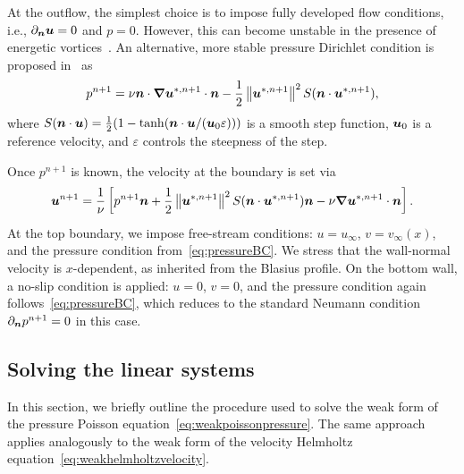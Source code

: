 \documentclass[../main.tex]{subfiles}
\begin{document}
At the outflow, the simplest choice is to impose fully developed flow conditions, i.e., $\partial_{\bm{n}} \bm{u} = 0$ and $p = 0$. However, this can become unstable in the presence of energetic vortices~\cite{nektaruserguide,outflowBoundaryCondition}. An alternative, more stable pressure Dirichlet condition is proposed in~\cite{outflowBoundaryCondition} as
\begin{equation}
	p^{n+1} = \nu \bm{n} \cdot \bm{\nabla} \bm{u}^{*,n+1} \cdot \bm{n} - \frac{1}{2} \left\|\bm{u}^{*,n+1}\right\|^2 S(\bm{n}\cdot \bm{u}^{*,n+1}),
	\label{eq:outflowBC}
\end{equation}
where $S(\bm{n} \cdot \bm{u}) = \frac{1}{2}(1 - \tanh(\bm{n} \cdot \bm{u} / (\bm{u}_0 \varepsilon)))$ is a smooth step function, $\bm{u}_0$ is a reference velocity, and $\varepsilon$ controls the steepness of the step.

Once $p^{n+1}$ is known, the velocity at the boundary is set via
\begin{equation}
	\bm{u}^{n+1} = \frac{1}{\nu} \left[ p^{n+1} \bm{n} + \frac{1}{2} \left\|\bm{u}^{*,n+1}\right\|^2 S(\bm{n} \cdot \bm{u}^{*,n+1}) \bm{n} - \nu \grad \bm{u}^{*,n+1} \cdot \bm{n} \right].
	\label{eq:outflowBCu}
\end{equation}
At the top boundary, we impose free-stream conditions: $u = u_\infty$, $v = v_\infty(x)$, and the pressure condition from~\eqref{eq:pressureBC}. We stress that the wall-normal velocity is $x$-dependent, as inherited from the Blasius profile. On the bottom wall, a no-slip condition is applied: $u = 0$, $v = 0$, and the pressure condition again follows~\eqref{eq:pressureBC}, which reduces to the standard Neumann condition $\partial_{\bm{n}} p^{n+1} = 0$ in this case.

\subsection{Solving the linear systems}\label{sec:solving}

In this section, we briefly outline the procedure used to solve the weak form of the pressure Poisson equation~\eqref{eq:weakpoissonpressure}. The same approach applies analogously to the weak form of the velocity Helmholtz equation~\eqref{eq:weakhelmholtzvelocity}.
\end{document}
